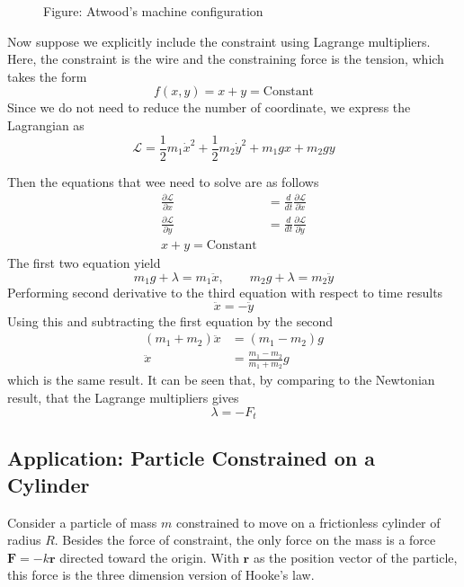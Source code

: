 \documentclass[../../../main.tex]{subfiles}
\begin{document}
\begin{figure*}
	\centering
	\caption*{Figure: Atwood's machine configuration}
\end{figure*}

Now suppose we explicitly include the constraint using Lagrange multipliers.
Here, the constraint is the wire and the constraining force is the tension, which takes the form 
\begin{equation*}
    f(x,y)=x+y=\text{Constant}
\end{equation*}
Since we do not need to reduce the number of coordinate, we express the Lagrangian as 
\begin{equation*}
    \mathcal{L}=\frac{1}{2}m_1\dot{x}^2+\frac{1}{2}m_2\dot{y}^2+m_1gx+m_2gy
\end{equation*}

Then the equations that wee need to solve are as follows
\begin{align*}
    \frac{\partial \mathcal{L}}{\partial x}&=\frac{d}{dt}\frac{\partial\mathcal{L}}{\partial\dot{x}}\\
    \frac{\partial \mathcal{L}}{\partial y}&=\frac{d}{dt}\frac{\partial\mathcal{L}}{\partial\dot{y}}\\
    x+y=\text{Constant}
\end{align*}
The first two equation yield
\begin{equation*}
    m_1g+\lambda=m_1\ddot{x},\qquad m_2g+\lambda=m_2\ddot{y}
\end{equation*}
Performing second derivative to the third equation with respect to time results
\begin{equation*}
    \ddot{x}=-\ddot{y}
\end{equation*}
Using this and subtracting the first equation by the second 
\begin{align*}
    (m_1+m_2)\ddot{x}&=(m_1-m_2)g\\
    \ddot{x}&=\frac{m_1-m_2}{m_1+m_2}g
\end{align*}
which is the same result. 
It can be seen that, by comparing to the Newtonian result, that the Lagrange multipliers gives
\begin{equation*}
    \lambda=-F_t
\end{equation*} 

\subsection{Application: Particle Constrained on a Cylinder}
Consider a particle of mass $m$ constrained to move on a frictionless cylinder of radius $R$.
Besides the force of constraint, the only force on the mass is a force $\mathbf{F}= -k\mathbf{r}$ directed toward the origin.
With $\mathbf{r}$ as the position vector of the particle, this force is the three dimension version of Hooke's law.
\end{document}
